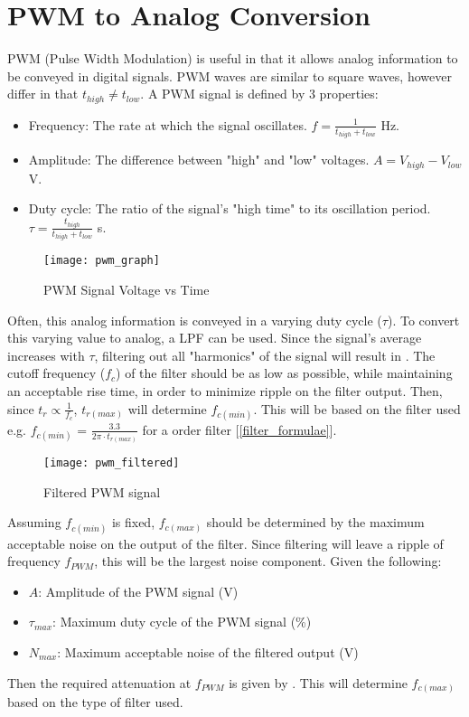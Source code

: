 \graphicspath{{content/1_literatureReview/figures/}}
\section{PWM to Analog Conversion}\label{sec:pwmAnalogConversion}

PWM (Pulse Width Modulation) is useful in that it allows analog information to be conveyed in digital signals.
PWM waves are similar to square waves, however differ in that $t_{high} \neq t_{low}$. A PWM signal is defined by 3 properties:
\begin{itemize}
    \item Frequency: The rate at which the signal oscillates. $f = \frac{1}{t_{high} + t_{low}}$ Hz.
    \item Amplitude: The difference between "high" and "low" voltages. $A = V_{high} - V_{low}$ V.
    \item Duty cycle: The ratio of the signal's "high time" to its oscillation period. $\tau = \frac{t_{high}}{t_{high} + t_{low}}$ s.
\end{itemize}

\begin{figure}[!htb]
  \centering
  \texttt{[image: pwm\_graph]}
  \caption{PWM Signal Voltage vs Time \cite{pwmGraph}}
\end{figure}

Often, this analog information is conveyed in a varying duty cycle ($\tau$). To convert this varying value to analog,
a LPF can be used. Since the signal's average increases with $\tau$, filtering out all "harmonics" of the
signal will result in  \cite{pwmAnalogConversion}. The cutoff frequency ($f_{c}$) of the filter
should be as low as possible, while maintaining an acceptable rise time, in order to minimize ripple on the filter output.
Then, since $t_r \propto \frac{1}{f_c}$, $t_{r(max)}$ will determine $f_{c(min)}$. This will be based on the filter used
e.g. $f_{c(min)}$ = $\frac{3.3}{2 \pi \cdot t_{r(max)}}$ for a  order filter [\ref{filter_formulae}].

\begin{figure}[!htb]
  \centering
  \texttt{[image: pwm\_filtered]}
  \caption{Filtered PWM signal}
\end{figure}

Assuming $f_{c(min)}$ is fixed, $f_{c(max)}$ should be determined by the maximum acceptable noise on the output of the filter.
Since filtering will leave a ripple of frequency $f_{PWM}$, this will be the largest noise component. Given the following:
\begin{itemize}
  \item $A$: Amplitude of the PWM signal (V)
  \item $\tau_{max}$: Maximum duty cycle of the PWM signal (\%)
  \item $N_{max}$: Maximum acceptable noise of the filtered output (V)
\end{itemize}

\noindent Then the required attenuation at $f_{PWM}$ is given by .
This will determine $f_{c(max)}$ based on the type of filter used.